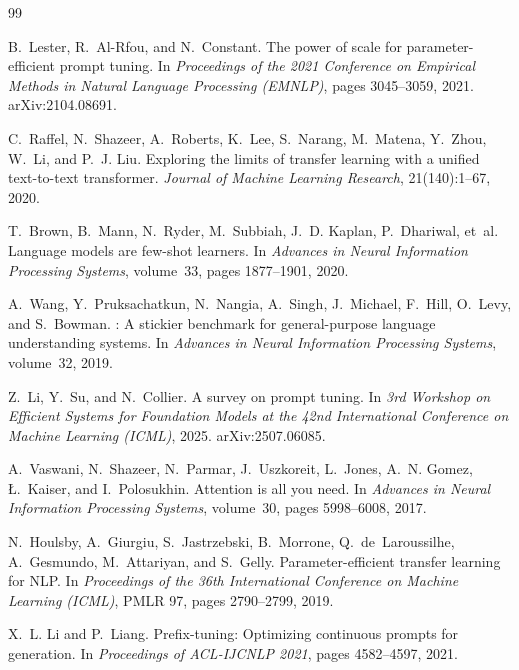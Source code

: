 \documentclass[12pt]{article}
\begin{document}
\newpage
\begin{thebibliography}{99}
\small
\setlength{\itemsep}{3pt}

B.~Lester, R.~Al-Rfou, and N.~Constant.
\newblock The power of scale for parameter-efficient prompt tuning.
\newblock In \emph{Proceedings of the 2021 Conference on Empirical Methods in Natural
  Language Processing (EMNLP)}, pages 3045--3059, 2021.
\newblock arXiv:2104.08691.

C.~Raffel, N.~Shazeer, A.~Roberts, K.~Lee, S.~Narang, M.~Matena, Y.~Zhou, W.~Li,
  and P.~J. Liu.
\newblock Exploring the limits of transfer learning with a unified text-to-text
  transformer.
\newblock \emph{Journal of Machine Learning Research}, 21(140):1--67, 2020.

T.~Brown, B.~Mann, N.~Ryder, M.~Subbiah, J.~D. Kaplan, P.~Dhariwal, et~al.
\newblock Language models are few-shot learners.
\newblock In \emph{Advances in Neural Information Processing Systems}, volume~33,
  pages 1877--1901, 2020.

A.~Wang, Y.~Pruksachatkun, N.~Nangia, A.~Singh, J.~Michael, F.~Hill, O.~Levy, and
  S.~Bowman.
: A stickier benchmark for general-purpose language understanding
  systems.
\newblock In \emph{Advances in Neural Information Processing Systems}, volume~32, 2019.

Z.~Li, Y.~Su, and N.~Collier.
\newblock A survey on prompt tuning.
\newblock In \emph{3rd Workshop on Efficient Systems for Foundation Models at the 42nd
  International Conference on Machine Learning (ICML)}, 2025.
\newblock arXiv:2507.06085.

A.~Vaswani, N.~Shazeer, N.~Parmar, J.~Uszkoreit, L.~Jones, A.~N. Gomez, {\L}.~Kaiser,
  and I.~Polosukhin.
\newblock Attention is all you need.
\newblock In \emph{Advances in Neural Information Processing Systems}, volume~30,
  pages 5998--6008, 2017.

N.~Houlsby, A.~Giurgiu, S.~Jastrzebski, B.~Morrone, Q.~de~Laroussilhe, A.~Gesmundo,
  M.~Attariyan, and S.~Gelly.
\newblock Parameter-efficient transfer learning for {NLP}.
\newblock In \emph{Proceedings of the 36th International Conference on Machine Learning
  (ICML)}, PMLR 97, pages 2790--2799, 2019.

X.~L. Li and P.~Liang.
\newblock Prefix-tuning: Optimizing continuous prompts for generation.
\newblock In \emph{Proceedings of ACL-IJCNLP 2021}, pages 4582--4597, 2021.


\end{thebibliography}
\end{document}
